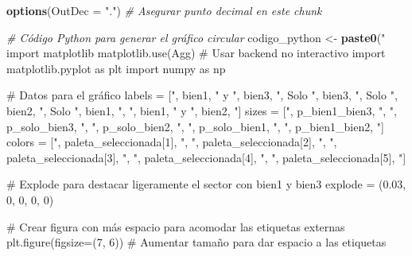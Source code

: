 \documentclass[
]{article}
\newenvironment{Shaded}{\begin{snugshade}}{\end{snugshade}}
\newcommand{\AttributeTok}[1]{\textcolor[rgb]{0.13,0.29,0.53}{#1}}
\newcommand{\CommentTok}[1]{\textcolor[rgb]{0.56,0.35,0.01}{\textit{#1}}}
\newcommand{\DecValTok}[1]{\textcolor[rgb]{0.00,0.00,0.81}{#1}}
\newcommand{\FunctionTok}[1]{\textcolor[rgb]{0.13,0.29,0.53}{\textbf{#1}}}
\newcommand{\NormalTok}[1]{#1}
\newcommand{\OtherTok}[1]{\textcolor[rgb]{0.56,0.35,0.01}{#1}}
\newcommand{\StringTok}[1]{\textcolor[rgb]{0.31,0.60,0.02}{#1}}
\begin{document}
\begin{Shaded}
\begin{Highlighting}[]
\FunctionTok{options}\NormalTok{(}\AttributeTok{OutDec =} \StringTok{"."}\NormalTok{)  }\CommentTok{\# Asegurar punto decimal en este chunk}

\CommentTok{\# Código Python para generar el gráfico circular}
\NormalTok{codigo\_python }\OtherTok{\textless{}{-}} \FunctionTok{paste0}\NormalTok{(}\StringTok{"}
\StringTok{import matplotlib}
\StringTok{matplotlib.use(\textquotesingle{}Agg\textquotesingle{})  \# Usar backend no interactivo}
\StringTok{import matplotlib.pyplot as plt}
\StringTok{import numpy as np}

\StringTok{\# Datos para el gráfico}
\StringTok{labels = [\textquotesingle{}"}\NormalTok{, bien1, }\StringTok{" y "}\NormalTok{, bien3, }\StringTok{"\textquotesingle{}, \textquotesingle{}Solo "}\NormalTok{, bien3, }\StringTok{"\textquotesingle{}, \textquotesingle{}Solo "}\NormalTok{, bien2, }\StringTok{"\textquotesingle{},}
\StringTok{          \textquotesingle{}Solo "}\NormalTok{, bien1, }\StringTok{"\textquotesingle{}, \textquotesingle{}"}\NormalTok{, bien1, }\StringTok{" y "}\NormalTok{, bien2, }\StringTok{"\textquotesingle{}]}
\StringTok{sizes = ["}\NormalTok{, p\_bien1\_bien3, }\StringTok{", "}\NormalTok{, p\_solo\_bien3, }\StringTok{", "}\NormalTok{, p\_solo\_bien2, }\StringTok{",}
\StringTok{         "}\NormalTok{, p\_solo\_bien1, }\StringTok{", "}\NormalTok{, p\_bien1\_bien2, }\StringTok{"]}
\StringTok{colors = [\textquotesingle{}"}\NormalTok{, paleta\_seleccionada[}\DecValTok{1}\NormalTok{], }\StringTok{"\textquotesingle{}, \textquotesingle{}"}\NormalTok{, paleta\_seleccionada[}\DecValTok{2}\NormalTok{], }\StringTok{"\textquotesingle{},}
\StringTok{          \textquotesingle{}"}\NormalTok{, paleta\_seleccionada[}\DecValTok{3}\NormalTok{], }\StringTok{"\textquotesingle{}, \textquotesingle{}"}\NormalTok{, paleta\_seleccionada[}\DecValTok{4}\NormalTok{], }\StringTok{"\textquotesingle{},}
\StringTok{          \textquotesingle{}"}\NormalTok{, paleta\_seleccionada[}\DecValTok{5}\NormalTok{], }\StringTok{"\textquotesingle{}]}

\StringTok{\# Explode para destacar ligeramente el sector con bien1 y bien3}
\StringTok{explode = (0.03, 0, 0, 0, 0)}

\StringTok{\# Crear figura con más espacio para acomodar las etiquetas externas}
\StringTok{plt.figure(figsize=(7, 6))  \# Aumentar tamaño para dar espacio a las etiquetas}


\end{Highlighting}
\end{Shaded}
\end{document}
